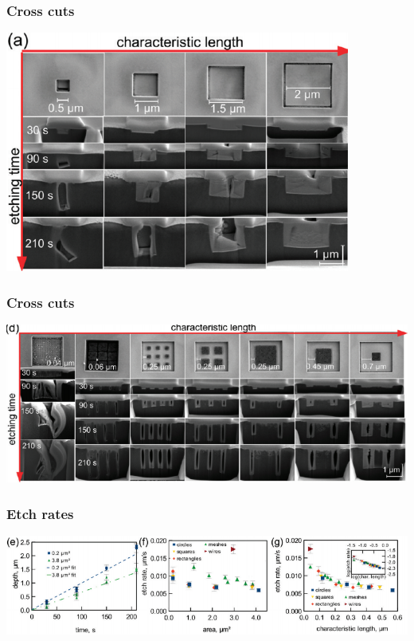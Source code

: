 \documentclass{beamer}
\begin{document}
\begin{frame}\frametitle{Cross cuts}
    \centering
    \begin{minipage}{0.8\textwidth}
		\includegraphics[width=\textwidth]{images/fig2.png}
	\end{minipage}
\end{frame}

\begin{frame}\frametitle{Cross cuts}
    \centering
    \begin{minipage}{\textwidth}
		\includegraphics[width=\textwidth]{images/fig3.png}
	\end{minipage}
\end{frame}

\begin{frame}\frametitle{Etch rates}
    \centering
    \begin{minipage}{\textwidth}
		\includegraphics[width=\textwidth]{images/fig4.png}
	\end{minipage}
\end{frame}
\end{document}
